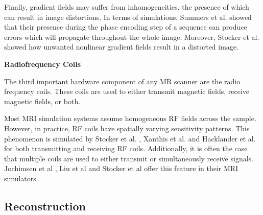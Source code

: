 \hfill

Finally, gradient fields may suffer from inhomogeneities, the presence of which can result in image distortions.
In terms of simulations, Summers et al. \cite{Summers1986} showed that their presence during the phase encoding step of a sequence can produce errors which will propagate throughout the whole image.
Moreover, Stocker et al. \cite{Stocker2010} showed how unwanted nonlinear gradient fields result in a distorted image.

\hfill

\large \textbf{Radiofrequency Coils} \normalsize

The third important hardware component of any MR scanner are the radio frequency coils.
These coils are used to either transmit magnetic fields, receive magnetic fields, or both.

\hfill

Most MRI simulation systems assume homogeneous RF fields across the sample.
However, in practice, RF coils have spatially varying sensitivity patterns.
This phenomenon is simulated by Stocker et al. \cite{Stocker2010}, Xanthis et al. \cite{Xanthis2014} and Hacklander et al. \cite{Hacklander2005} for both transmitting and receiving RF coils.
Additionally, it is often the case that multiple coils are used to either transmit or simultaneously receive signals.
Jochimsen et al \cite{Jochimsen2004}, Liu et al \cite{Liu2014} and Stocker et al \cite{Stocker2010} offer this feature in their MRI simulators.

\hfill

\subsection{Reconstruction}

